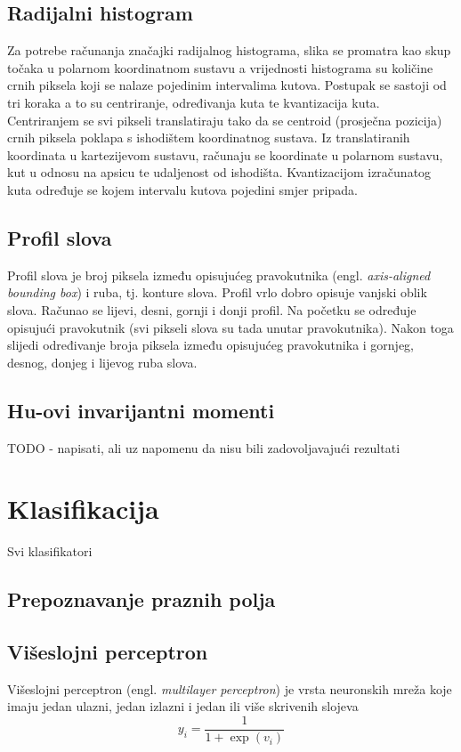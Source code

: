 \documentclass[a4paper,twocolumn,dvipdfm]{article}
\begin{document}
\subsection{Radijalni histogram}
Za potrebe računanja značajki radijalnog histograma, slika se promatra kao skup točaka u polarnom koordinatnom sustavu a vrijednosti histograma su količine crnih piksela koji se nalaze pojedinim intervalima kutova. Postupak se sastoji od tri koraka a to su centriranje, određivanja kuta te kvantizacija kuta. Centriranjem se svi pikseli translatiraju tako da se centroid (prosječna pozicija) crnih piksela poklapa s ishodištem koordinatnog sustava. Iz translatiranih koordinata u kartezijevom sustavu, računaju se koordinate u polarnom sustavu, kut u odnosu na apsicu te udaljenost od ishodišta. Kvantizacijom izračunatog kuta određuje se kojem intervalu kutova pojedini smjer pripada.

\subsection{Profil slova}
Profil slova je broj piksela između opisujućeg pravokutnika (engl. \emph{axis-aligned bounding box}) i ruba, tj. konture slova. Profil vrlo dobro opisuje vanjski oblik slova. Računao se lijevi, desni, gornji i donji profil. Na početku se određuje opisujući pravokutnik (svi pikseli slova su tada unutar pravokutnika). Nakon toga slijedi određivanje broja piksela između opisujućeg pravokutnika i gornjeg, desnog, donjeg i lijevog ruba slova. 

\subsection{Hu-ovi invarijantni momenti}
TODO - napisati, ali uz napomenu da nisu bili zadovoljavajući rezultati


\section{Klasifikacija}
Svi klasifikatori 

\subsection{Prepoznavanje praznih polja}

\subsection{Višeslojni perceptron}
Višeslojni perceptron \cite{rosenblatt1958perceptron} (engl. \emph{multilayer
perceptron}) je vrsta neuronskih mreža koje imaju jedan ulazni, jedan izlazni i
jedan ili više skrivenih slojeva
\begin{equation}
y_i = \frac{1}{1 + \exp(v_i)}
\label{equation:sig}
\end{equation}
\end{document}
